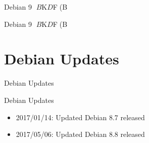 {{\begin{frame}
\begin{center}
{\begin{frame}{Debian 9 $B$K$D$$$F(B}
\end{frame}


\begin{frame}{Debian 9 $B$K$D$$$F(B}%
\end{frame}


\section{Debian Updates}
\begin{frame}\begin{center}\Huge{Debian Updates}\end{center}\end{frame}

%  
%


\begin{frame}{Debian Updates}%

\begin{itemize}[<+->]
\item 2017/01/14:  Updated Debian 8.7 released\\
\item 2017/05/06:  Updated Debian 8.8 released\\
\ \\
   \small{}


\end{itemize}
\end{frame}}
\end{center}
\end{frame}}}
